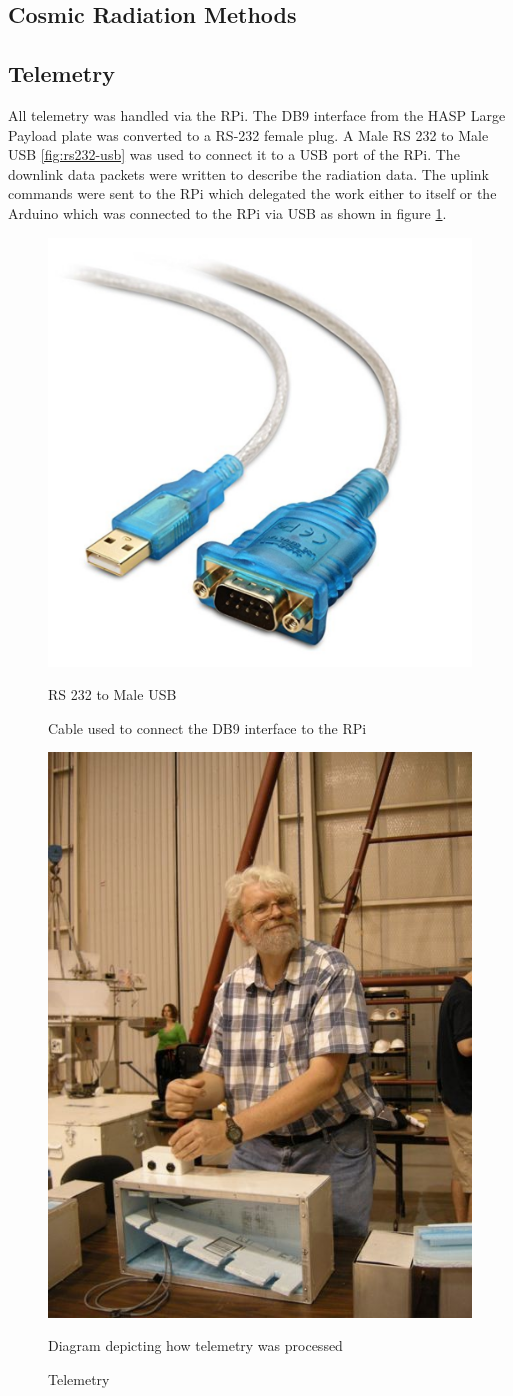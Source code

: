 \subsection{Cosmic Radiation Methods}
\label{sec:Rad-Methods}

\subsection{Telemetry}
\label{sec:Telemetry}

All telemetry was handled via the RPi. The DB9 interface from the HASP Large Payload plate was converted to a 
RS-232 female plug. A Male RS 232 to Male USB \ref{fig:rs232-usb} was used to connect it to a USB port of the RPi. 
The downlink data packets were written to describe the radiation data. 
The uplink commands were sent to the RPi which delegated the work either to itself or the Arduino which 
was connected to the RPi via USB as shown in figure \ref{fig:telem-diagram}.

\begin{figure}[h!]
\centering
\begin{minipage}{.5\textwidth}
  \centering
  \includegraphics[width=.4\linewidth]{figures/rs232tousb.png}
  \caption{RS 232 to Male USB}{Cable used to connect the DB9 interface to the RPi}
  \label{fig:rs232tousb}
\end{minipage}
\begin{minipage}{.5\textwidth}
  \centering
  \includegraphics[width=.4\linewidth]{figures/duck.jpg}
  \caption{Telemetry}{Diagram depicting how telemetry was processed}
  \label{fig:telem-diagram}
\end{minipage}
\end{figure}

